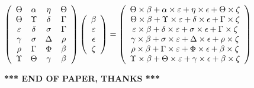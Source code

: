 \documentclass[12pt]{article}
\begin{document}
$  %
 \left( \begin{array}
 {
 c
 c
 c
 c
 }
 \Theta & 
 \alpha & 
 \eta & 
 \Theta \\ 
 \Theta & 
 \Upsilon & 
 \delta & 
 \Gamma \\ 
 \varepsilon & 
 \delta & 
 \sigma & 
 \Gamma \\ 
 \gamma & 
 \sigma & 
 \Delta & 
 \rho \\ 
 \rho & 
 \Gamma & 
 \Phi & 
 \beta \\ 
 \Upsilon & 
 \Theta & 
 \gamma & 
 \beta
 \end{array} \right)
 \left( \begin{array}
 {
 c
 }
 \beta \\ 
 \varepsilon \\ 
 \epsilon \\ 
                    \zeta
 \end{array} \right)
=
 \left( \begin{array}
 {
 c
 }
  \Theta \times  \beta +  \alpha \times  \varepsilon +  \eta \times  \epsilon +  \Theta \times                     \zeta \\ 
  \Theta \times  \beta +  \Upsilon \times  \varepsilon +  \delta \times  \epsilon +  \Gamma \times                     \zeta \\ 
  \varepsilon \times  \beta +  \delta \times  \varepsilon +  \sigma \times  \epsilon +  \Gamma \times                     \zeta \\ 
  \gamma \times  \beta +  \sigma \times  \varepsilon +  \Delta \times  \epsilon +  \rho \times                     \zeta \\ 
  \rho \times  \beta +  \Gamma \times  \varepsilon +  \Phi \times  \epsilon +  \beta \times                     \zeta \\ 
  \Upsilon \times  \beta +  \Theta \times  \varepsilon +  \gamma \times  \epsilon +  \beta \times                     \zeta
 \end{array} \right)
$
 
 
 
 
 
\noindent{}

 
 
   
   
 \vspace{0.2in}
 
   
   
   
   
\vspace{1.0in} 
{\textbf{\large{ *** END OF PAPER, THANKS *** }}} 
   
\end{document}
